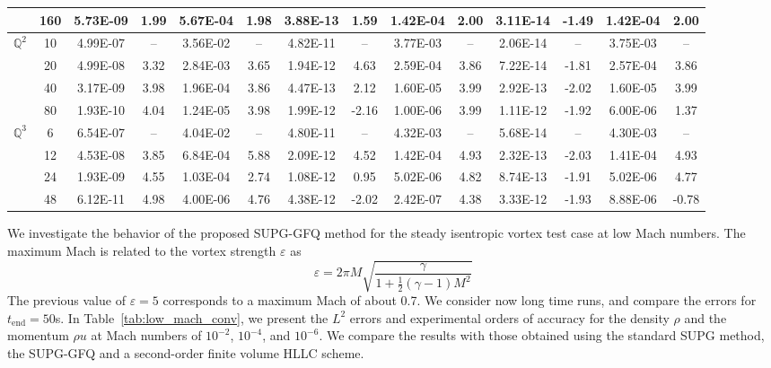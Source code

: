 \documentclass[a4paper,10pt]{article}
\begin{document}
\begin{table}
\begin{tabular}{c|c|cc|cc|cc|cc|cc|cc}
		& 160& 5.73E-09 & 1.99 & 5.67E-04 & 1.98 & 3.88E-13 & 1.59 & 1.42E-04 & 2.00 & 3.11E-14 & -1.49  & 1.42E-04 & 2.00 \\
		\hline
		$\mathbb{Q}^2$ & 10 & 4.99E-07  & --   & 3.56E-02 & --   & 4.82E-11 & --    & 3.77E-03 & --   & 2.06E-14 & --    & 3.75E-03 & --    \\
		& 20 & 4.99E-08  & 3.32 & 2.84E-03 & 3.65 & 1.94E-12 & 4.63  & 2.59E-04 & 3.86 & 7.22E-14 & -1.81 & 2.57E-04 & 3.86  \\
		& 40 & 3.17E-09  & 3.98 & 1.96E-04 & 3.86 & 4.47E-13 & 2.12  & 1.60E-05 & 3.99 & 2.92E-13 & -2.02 & 1.60E-05 & 3.99  \\
		& 80 & 1.93E-10  & 4.04 & 1.24E-05 & 3.98 & 1.99E-12 & -2.16 & 1.00E-06 & 3.99 & 1.11E-12 & -1.92 & 6.00E-06 & 1.37  \\
		\hline
		$\mathbb{Q}^3$ & 6  & 6.54E-07  & --   & 4.04E-02 & --   & 4.80E-11 & --    & 4.32E-03 & --    & 5.68E-14 & --    & 4.30E-03 & --    \\
		& 12 & 4.53E-08  & 3.85 & 6.84E-04 & 5.88 & 2.09E-12 & 4.52  & 1.42E-04 & 4.93  & 2.32E-13 & -2.03 & 1.41E-04 & 4.93  \\
		& 24 & 1.93E-09  & 4.55 & 1.03E-04 & 2.74 & 1.08E-12 & 0.95  & 5.02E-06 & 4.82  & 8.74E-13 & -1.91 & 5.02E-06 & 4.77  \\
		& 48 & 6.12E-11  & 4.98 & 4.00E-06 & 4.76 & 4.38E-12 & -2.02 & 2.42E-07 & 4.38  & 3.33E-12 & -1.93 & 8.88E-06 & -0.78 \\
		\hline
	\end{tabular}
	
\end{table}
We investigate the  behavior of the proposed SUPG-GFQ method for the steady isentropic vortex test case at low Mach numbers. 
The maximum Mach is related to the vortex strength $\varepsilon$ as 
$$
\varepsilon = 2\pi M \sqrt{\frac{\gamma}{1 + \frac{1}{2}(\gamma - 1)M^2}}$$
\noindent
The previous value  of $\varepsilon=5$ corresponds to a maximum Mach of about 0.7.  
%
%
%
We consider now long time runs, and compare the errors for   $t_{\mathrm{end}}=50$s.
In Table~\ref{tab:low_mach_conv}, we present the  $L^2$ errors and experimental orders of accuracy for the density $\rho$ and the momentum $\rho u$ at Mach numbers of $10^{-2}$, $10^{-4}$, and $10^{-6}$.
We compare the results with those obtained using the standard SUPG method, the SUPG-GFQ and a second-order finite volume HLLC scheme. 
\end{document}

